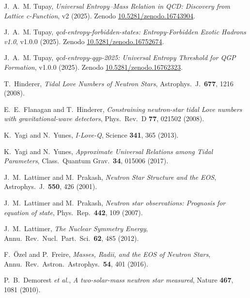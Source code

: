 \documentclass[11pt]{article}
\begin{document}
\begin{thebibliography}{99}\setlength{\itemsep}{0.2em}

J.~A.~M. Tupay, \emph{Universal Entropy--Mass Relation in QCD: Discovery from Lattice c-Function}, v2 (2025).
Zenodo \href{https://doi.org/10.5281/zenodo.16743904}{10.5281/zenodo.16743904}.

J.~A.~M. Tupay, \emph{qcd-entropy-forbidden-states: Entropy-Forbidden Exotic Hadrons v1.0}, v1.0.0 (2025).
Zenodo \href{https://doi.org/10.5281/zenodo.16752674}{10.5281/zenodo.16752674}.

J.~A.~M. Tupay, \emph{qcd-entropy-qgp-2025: Universal Entropy Threshold for QGP Formation}, v1.0.0 (2025).
Zenodo \href{https://doi.org/10.5281/zenodo.16762323}{10.5281/zenodo.16762323}.

T.~Hinderer, \emph{Tidal Love Numbers of Neutron Stars}, Astrophys.\ J.\ \textbf{677}, 1216 (2008).

E.~E.~Flanagan and T.~Hinderer, \emph{Constraining neutron-star tidal Love numbers with gravitational-wave detectors}, Phys.\ Rev.\ D \textbf{77}, 021502 (2008).

K.~Yagi and N.~Yunes, \emph{I-Love-Q}, Science \textbf{341}, 365 (2013).

K.~Yagi and N.~Yunes, \emph{Approximate Universal Relations among Tidal Parameters}, Class.\ Quantum Grav.\ \textbf{34}, 015006 (2017).

J.~M.~Lattimer and M.~Prakash, \emph{Neutron Star Structure and the EOS}, Astrophys.\ J.\ \textbf{550}, 426 (2001).

J.~M.~Lattimer and M.~Prakash, \emph{Neutron star observations: Prognosis for equation of state}, Phys.\ Rep.\ \textbf{442}, 109 (2007).

J.~M.~Lattimer, \emph{The Nuclear Symmetry Energy}, Annu.\ Rev.\ Nucl.\ Part.\ Sci.\ \textbf{62}, 485 (2012).

F.~\"Ozel and P.~Freire, \emph{Masses, Radii, and the EOS of Neutron Stars}, Annu.\ Rev.\ Astron.\ Astrophys.\ \textbf{54}, 401 (2016).

P.~B.~Demorest \emph{et al.}, \emph{A two-solar-mass neutron star measured}, Nature \textbf{467}, 1081 (2010).


\end{thebibliography}
\end{document}
